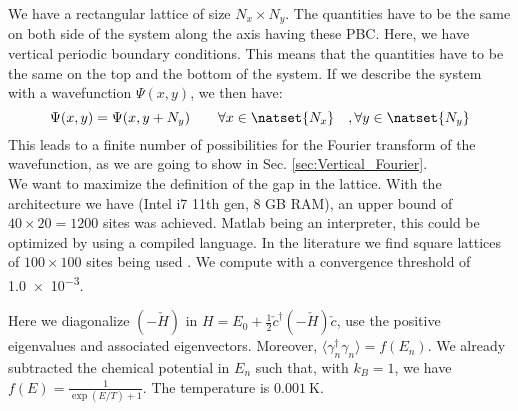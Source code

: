 \documentclass[../main.tex]{subfile}
\begin{document}
We have a rectangular lattice of size $N_x\times N_y$. The quantities have to be the same on both side of the system along the axis having these PBC.
Here, we have vertical periodic boundary conditions. This means that the quantities have to be the same on the top and the bottom of the system. 
If we describe the system with a wavefunction $\Psi(x,y)$, we then have:
\begin{equation}
    \Psi(x,y) = \Psi(x,y+N_y) \quad\quad \forall x\in\natset{N_x}\quad, \forall y \in \natset{N_y}
\end{equation} 
This leads to a finite number of possibilities for the Fourier transform of the wavefunction, as we are going to show in Sec. \ref{sec:Vertical_Fourier}.\\

We want to maximize the definition of the gap in the lattice. With the architecture we have (Intel i7 11th gen, 8 GB RAM),
an upper bound of $40\times20=1200$ sites was achieved. Matlab being an interpreter, this could be optimized by using a compiled language.
In the literature we find square lattices of $100\times100$ sites being used \cite{Mjos2019}. We compute with a convergence threshold of \num{1.0e-3}.

Here we diagonalize $(-\check{H})$ in $H = E_0 +\frac{1}{2} \check{c}^{\dagger}(-\check{H})\check{c}$, use the positive 
eigenvalues and associated eigenvectors. Moreover, $\langle \gamma^{\dagger}_n\gamma_n\rangle = f(E_n)$. We already subtracted the chemical
potential in $E_n$ such that, with $k_B=1$, we have $f(E)= \frac{1}{\exp(E/T)+1}$. The temperature is $\SI{0.001}{\kelvin}$.\\
\end{document}
